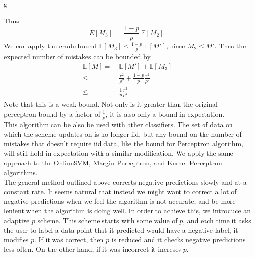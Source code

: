 g\documentclass[12pt]{article}
\newcommand{\E}[0]{\mathbb{E}}
\begin{document}
Thus
\[
E[M_3] = \ \frac{1-p}{p}\ \E[M_2].
\]
We can apply the crude bound $\E[M_3] \leq \frac{1-p}{p}\ \E[M']$, since $M_2 \leq M'$. Thus the expected number of mistakes can be bounded by
\begin{align*}
\E[M]  =  &\ \E[M'] + \E[M_3] \\
\leq & \ \frac{r^2}{\rho^2} + \frac{1-p}{p}\frac{r^2}{\rho^2} \\
\leq  & \ \frac{1}{p}\frac{r^2}{\rho^2}
\end{align*}
Note that this is a weak bound.  Not only is it greater than the
original perceptron bound by a factor of $\frac{1}{p}$, it is also only a
bound in expectation.\\


This algorithm can be also be used with other classifiers.  The set of data on which the scheme updates on is no longer iid, but any bound on the number of mistakes that doesn't require iid data, like the bound for Perceptron algorithm, will still hold in expectation with a similar modification. We apply the same approach to the OnlineSVM, Margin Perceptron, and Kernel Perceptron algorithms.  \\
The general method outlined above corrects negative predictions slowly and at a constant rate.  It seems natural that instead we might want to correct a lot of negative predictions when we feel the algorithm is not accurate, and be more lenient when the algorithm is doing well.  In order to achieve this, we introduce an adaptive $p$ scheme.  This scheme starts with some value of $p$, and each time it asks the user to label a data point that it predicted would have a negative label, it modifies $p$.  If it was correct, then $p$ is reduced and it checks negative predictions less often.  On the other hand, if it was incorrect it increses $p$. 
\end{document}
